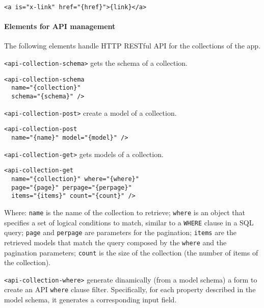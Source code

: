\begin{lstlisting}[language=HTML5]
<a is="x-link" href="{href}">{link}</a>
\end{lstlisting}

\paragraph{Elements for API management}

The following elements handle HTTP RESTful API for the collections of the app.

\texttt{<api-collection-schema>} gets the schema of a collection. 

\begin{lstlisting}[language=HTML5]
<api-collection-schema 
  name="{collection}" 
  schema="{schema}" />
\end{lstlisting}

\vspace{0.2cm}

\texttt{<api-collection-post>} create a model of a collection. 

\begin{lstlisting}[language=HTML5]
<api-collection-post 
  name="{name}" model="{model}" />
\end{lstlisting}

\vspace{0.2cm}

\texttt{<api-collection-get>} gets models of a collection. 

\begin{lstlisting}[language=HTML5]
<api-collection-get 
  name="{collection}" where="{where}" 
  page="{page}" perpage="{perpage}"  
  items="{items}" count="{count}" />
\end{lstlisting}

Where: 
\texttt{name} is the name of the collection to retrieve; 
\texttt{where} is an object that specifies a set of logical conditions to match, similar to a \texttt{WHERE} clause in a SQL query;
\texttt{page} and \texttt{perpage} are parameters for the pagination;
\texttt{items} are the retrieved models that match the query composed by the \texttt{where} and the pagination parameters;
\texttt{count} is the size of the collection (the number of items of the collection).

\vspace{0.2cm}

\texttt{<api-collection-where>} generate dinamically (from a model schema) a form to create an API \texttt{where} clause filter. Specifically, for each property described in the model schema, it generates a corresponding input field. 

